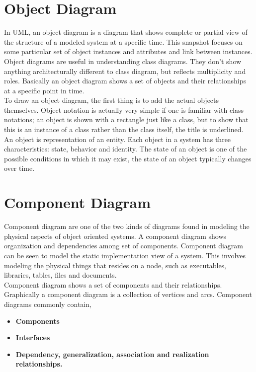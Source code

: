 \documentclass[openany,12pt]{report}
\begin{document}
\newpage
\section{Object Diagram}
\hspace*{0.5in}In UML, an object diagram is a diagram that shows complete or partial view of the structure of a modeled system at a specific time. This snapshot focuses on some particular set of object instances and attributes and link between instances. Object diagrams are useful in understanding class diagrams. They don't show anything architecturally different to class diagram, but reflects multiplicity and roles. Basically an object diagram shows a set of objects and their relationships at a specific point in time.\\
\hspace*{0.5in}To draw an object diagram, the first thing is to add the actual objects themselves. Object notation is actually very simple if one is familiar with class notations; an object is shown with a rectangle just like a class, but to show that this is an instance of a class rather than the class itself, the title is underlined. An object is representation of an entity. Each object in  a system has three characteristics: state, behavior and identity. The state of an object is one of the possible conditions in which it may exist, the state of an object typically changes over time.
\newpage


\newpage
\section{Component Diagram}
\hspace*{0.5in}Component diagram are one of the two kinds of diagrams found in modeling the physical aspects of object oriented systems. A component diagram shows organization and dependencies among set of components. Component diagram can be seen to model the static implementation view of a system. This involves modeling the physical things that resides on a node, such as executables, libraries, tables, files and documents.\\
\hspace*{0.5in}Component diagram shows a set of components and their relationships. Graphically a component diagram is a collection of vertices and arcs. Component diagrams commonly contain,
\begin{itemize}
\item{\textbf{Components}}
\item{\textbf{Interfaces}}
\item{\textbf{Dependency, generalization, association and realization relationships.}}
\end{itemize}
\end{document}
